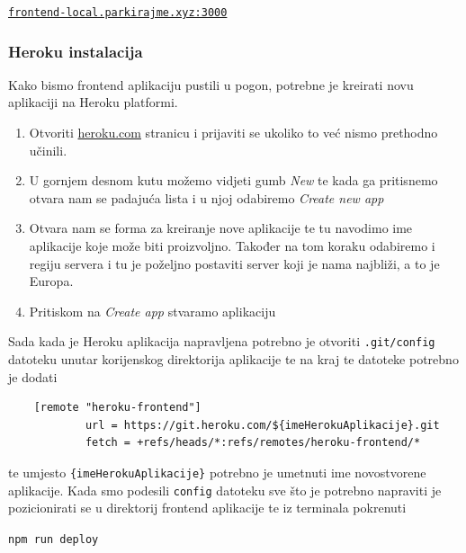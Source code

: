								\begin{center}
										\href{http://frontend-local.parkirajme.xyz:3000/}{\texttt{frontend-local.parkirajme.xyz:3000}}
								\end{center}
		             
						\pagebreak
		    
						\subsubsection*{Heroku instalacija}
	        
								Kako bismo frontend aplikaciju pustili u pogon, potrebne je kreirati novu aplikaciji na Heroku platformi.
								
								\begin{enumerate}
									\item Otvoriti \href{https://dashboard.heroku.com/apps}{heroku.com} stranicu i prijaviti se ukoliko to već nismo prethodno učinili.
									\item U gornjem desnom kutu možemo vidjeti gumb \textit{New} te kada ga pritisnemo otvara nam se padajuća lista i u njoj odabiremo \textit{Create new app}
									\item Otvara nam se forma za kreiranje nove aplikacije te tu navodimo ime aplikacije koje može biti proizvoljno. Također na tom koraku odabiremo i regiju servera i tu je poželjno postaviti server koji je nama najbliži, a to je Europa.
									\item Pritiskom na \textit{Create app} stvaramo aplikaciju
		        		\end{enumerate}
		        
		        		Sada kada je Heroku aplikacija napravljena potrebno je otvoriti \texttt{.git/config} datoteku unutar korijenskog direktorija aplikacije te na kraj te datoteke potrebno je dodati

                \begin{verbatim}
    [remote "heroku-frontend"]
        	url = https://git.heroku.com/${imeHerokuAplikacije}.git
        	fetch = +refs/heads/*:refs/remotes/heroku-frontend/*
								\end{verbatim}
								
								te umjesto \texttt{\{imeHerokuAplikacije\}} potrebno je umetnuti ime novostvorene aplikacije. Kada smo podesili \texttt{config} datoteku sve što je potrebno napraviti je pozicionirati se u direktorij frontend aplikacije te iz terminala pokrenuti 

								\begin{center}
										\texttt{npm run deploy}
								\end{center}
								
